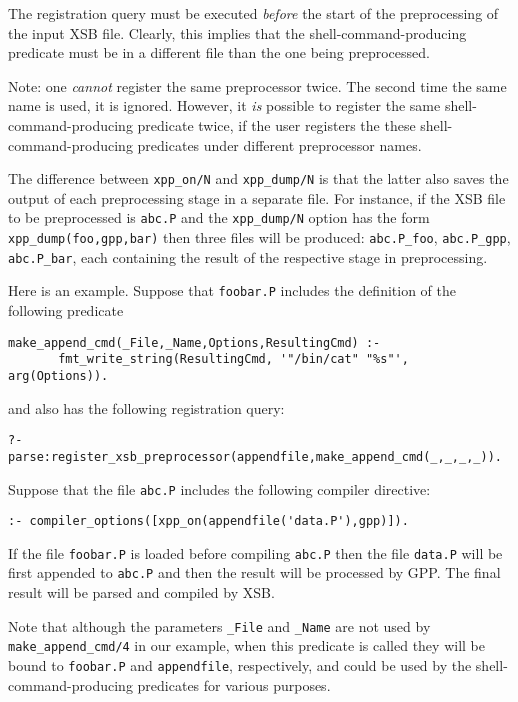 \begin{description}
\begin{itemize}
    The registration query must be executed \emph{before} the start of the
    preprocessing of the input XSB file. Clearly, this implies that the
    shell-command-producing predicate must be in a different file than the
    one being preprocessed.

    Note: one \emph{cannot} register the same preprocessor twice. The
    second time the same name is used, it is ignored. However, it \emph{is}
    possible to register the same shell-command-producing predicate twice,
    if the user registers the these shell-command-producing predicates
    under different preprocessor names.
  \end{itemize}

  The difference between {\tt xpp\_on/N} and {\tt xpp\_dump/N}  
  is that the latter also saves the output of each preprocessing stage in a
  separate file. For instance, if the XSB file to be preprocessed
  is {\tt abc.P} and the {\tt xpp\_dump/N} option has the form
  {\tt xpp\_dump(foo,gpp,bar)} then three files will be produced:
  {\tt abc.P\_foo}, {\tt abc.P\_gpp}, {\tt abc.P\_bar}, each containing the
  result of the respective stage in preprocessing.   

  Here is an example. Suppose that {\tt foobar.P} includes the definition of
  the following predicate
\begin{verbatim}
make_append_cmd(_File,_Name,Options,ResultingCmd) :-
       fmt_write_string(ResultingCmd, '"/bin/cat" "%s"', arg(Options)).
\end{verbatim}
  and also has the following registration query:
\begin{verbatim}
?- parse:register_xsb_preprocessor(appendfile,make_append_cmd(_,_,_,_)).  
\end{verbatim}
  Suppose that the file {\tt abc.P} includes the following compiler directive:
\begin{verbatim}
:- compiler_options([xpp_on(appendfile('data.P'),gpp)]).  
\end{verbatim}
  If the file {\tt foobar.P} is loaded before compiling {\tt abc.P} then  
  the file {\tt data.P} will be first appended to {\tt abc.P} and then
  the result will be processed by GPP. The final result will be parsed and
  compiled by XSB.

  Note that although the parameters {\tt \_File} and {\tt \_Name} are not
  used by {\tt make\_append\_cmd/4} in our example, when this predicate is
  called they will be bound to {\tt foobar.P} and {\tt appendfile},
  respectively, and could be used by the shell-command-producing predicates
  for various purposes.






\end{description}
